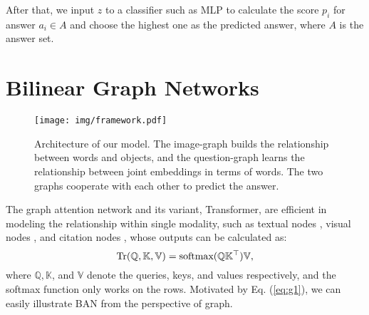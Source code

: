 \documentclass[10pt,twocolumn,letterpaper]{article}
\begin{document}
After that, we input $z$ to a classifier such as MLP to calculate the score $p_i$ for answer $a_i \in A$ and choose the highest one as the predicted answer, where $A$ is the answer set.

\section{Bilinear Graph Networks} \label{sec:bgn}
\begin{figure*}[t!]
	\centering
	\texttt{[image: img/framework.pdf]}
	\caption{Architecture of our model. The image-graph builds the relationship between words and objects, and the question-graph learns the relationship between joint embeddings in terms of words. The two graphs cooperate with each other to predict the answer.}
	\label{fig:framework}
\vspace{-5pt}
\end{figure*}
The graph attention network and its variant, Transformer, are efficient in modeling the relationship within single modality, such as textual nodes \cite{vaswani2017attention, devlin2018bert}, visual nodes \cite{chen2019graph, yang2018graph}, and citation nodes \cite{velickovic2017graph}, whose outputs can be calculated as:
\vspace{-5pt}
\begin{equation} \label{eq:g1}
\text{Tr}(\mathbb{Q}, \mathbb{K}, \mathbb{V}) = \text{softmax}(\mathbb{Q} \mathbb{K}^\top) \mathbb{V},
\vspace{-5pt}
\end{equation}
where $\mathbb{Q}, \mathbb{K}$, and $\mathbb{V}$ denote the queries, keys, and values respectively, and the softmax function only works on the rows. Motivated by Eq. (\ref{eq:g1}), we can easily illustrate BAN from the perspective of graph.
\end{document}
